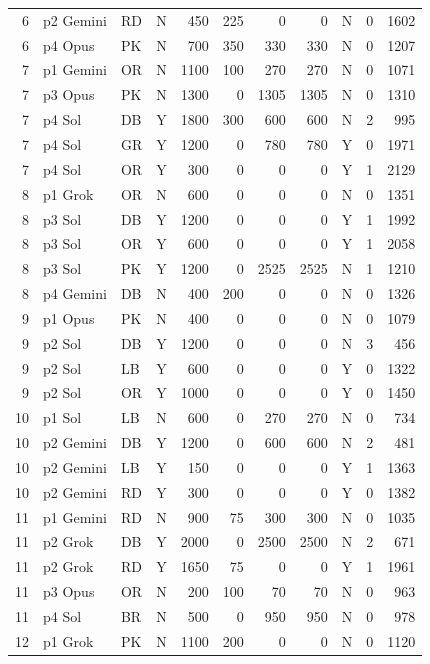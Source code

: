 \begin{longtable}{r l l l r r r r l r r}
6 & p2 Gemini & RD & N & 450 & 225 & 0 & 0 & N & 0 & 1602 \\
6 & p4 Opus & PK & N & 700 & 350 & 330 & 330 & N & 0 & 1207 \\
7 & p1 Gemini & OR & N & 1100 & 100 & 270 & 270 & N & 0 & 1071 \\
7 & p3 Opus & PK & N & 1300 & 0 & 1305 & 1305 & N & 0 & 1310 \\
7 & p4 Sol & DB & Y & 1800 & 300 & 600 & 600 & N & 2 & 995 \\
7 & p4 Sol & GR & Y & 1200 & 0 & 780 & 780 & Y & 0 & 1971 \\
7 & p4 Sol & OR & Y & 300 & 0 & 0 & 0 & Y & 1 & 2129 \\
8 & p1 Grok & OR & N & 600 & 0 & 0 & 0 & N & 0 & 1351 \\
8 & p3 Sol & DB & Y & 1200 & 0 & 0 & 0 & Y & 1 & 1992 \\
8 & p3 Sol & OR & Y & 600 & 0 & 0 & 0 & Y & 1 & 2058 \\
8 & p3 Sol & PK & Y & 1200 & 0 & 2525 & 2525 & N & 1 & 1210 \\
8 & p4 Gemini & DB & N & 400 & 200 & 0 & 0 & N & 0 & 1326 \\
9 & p1 Opus & PK & N & 400 & 0 & 0 & 0 & N & 0 & 1079 \\
9 & p2 Sol & DB & Y & 1200 & 0 & 0 & 0 & N & 3 & 456 \\
9 & p2 Sol & LB & Y & 600 & 0 & 0 & 0 & Y & 0 & 1322 \\
9 & p2 Sol & OR & Y & 1000 & 0 & 0 & 0 & Y & 0 & 1450 \\
10 & p1 Sol & LB & N & 600 & 0 & 270 & 270 & N & 0 & 734 \\
10 & p2 Gemini & DB & Y & 1200 & 0 & 600 & 600 & N & 2 & 481 \\
10 & p2 Gemini & LB & Y & 150 & 0 & 0 & 0 & Y & 1 & 1363 \\
10 & p2 Gemini & RD & Y & 300 & 0 & 0 & 0 & Y & 0 & 1382 \\
11 & p1 Gemini & RD & N & 900 & 75 & 300 & 300 & N & 0 & 1035 \\
11 & p2 Grok & DB & Y & 2000 & 0 & 2500 & 2500 & N & 2 & 671 \\
11 & p2 Grok & RD & Y & 1650 & 75 & 0 & 0 & Y & 1 & 1961 \\
11 & p3 Opus & OR & N & 200 & 100 & 70 & 70 & N & 0 & 963 \\
11 & p4 Sol & BR & N & 500 & 0 & 950 & 950 & N & 0 & 978 \\
12 & p1 Grok & PK & N & 1100 & 200 & 0 & 0 & N & 0 & 1120 \\

\end{longtable}
